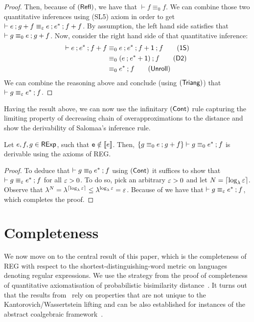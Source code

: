 \begin{proof}
		
		Then, because of $(\textsf{Refl})$, we have that $\vdash f \equiv_0 f$. We can combine those two quantitative inferences using \textsf{(SL5)} axiom in order to get $\vdash e \mathbin{;} g + f \equiv_{\varepsilon} e \mathbin{;} e^\ast \mathbin{;} f  + f $. By assumption, the left hand side satisfies that $\vdash g \equiv_0 e \mathbin{;} g + f$. Now, consider the right hand side of that quantitative inference:
	\begin{align*}
		\vdash e \seq e^{\ast} \seq f + f &\equiv_0 e \seq e^\ast \seq f + \one \seq f \tag{\textsf{1S}} \\
		&\equiv_0 (e \seq e^* + \one) \seq f \tag{\textsf{D2}} \\
		&\equiv_0 e^{*} \seq f \tag{\textsf{Unroll}}
	\end{align*}
	We can combine the reasoning above and conclude (using $(\textsf{Triang})$) that $\vdash g \equiv_{\varepsilon} e^\ast \mathbin{;} f$.
\end{proof}
Having the result above, we can now use the infinitary $(\textsf{Cont})$ rule capturing the limiting property of decreasing chain of overapproximations to the distance and show the derivability of Salomaa's inference rule.
\begin{lemma}
	Let $e,f,g \in \mathsf{RExp}$, such that $\mathtt{e} \notin \left\llbracket{e}\right\rrbracket$. Then, $\{g \equiv_0 e \mathbin{;} g + f\} \vdash g \equiv_{0} e^{\ast} \mathbin{;} f$ is derivable using the axioms of \textsf{REG}.

\end{lemma}
\begin{proof}
To deduce that $\vdash g \equiv_0 e^{\ast} \mathbin{;} f$ using $(\textsf{Cont})$ it suffices to show that $\vdash g \equiv_{\varepsilon} e^{\ast} \mathbin{;} f$ for all $\varepsilon > 0$.  To do so, pick an arbitrary $\varepsilon > 0$ and let $N = \lceil \log_{\lambda} \varepsilon \rceil$. Observe that $\lambda^N = \lambda^{\lceil \log_{\lambda} \varepsilon \rceil} \leq \lambda^{\log_{\lambda} \varepsilon} = \varepsilon$. Because of  we have that $\vdash g \equiv_{\varepsilon} e^{\ast} \mathbin{;} f$, which completes the proof.
\end{proof}
\section{Completeness}\label{c2:sec:completeness}
We now move on to the central result of this paper, which is the completeness of \textsf{REG} with respect to the shortest-distinguishing-word metric on languages denoting regular expressions. We use the strategy from the proof of completeness of quantitative axiomatisation of probabilistic bisimilarity distance~\cite{Bacci:2018:Bisimilarity}. It turns out that the results from~\cite{Bacci:2018:Bisimilarity} rely on properties that are not unique to the Kantorovich/Wassertstein lifting and can be also established for instances of the abstract coalgebraic framework~\cite{Baldan:2018:Coalgebraic}.


